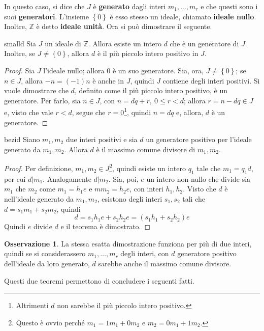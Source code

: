 \documentclass[11pt, a4paper]{scrartcl}
\theoremstyle{definition}
\numberwithin{esempio}{section}
\theoremstyle{definition}
\newtheorem{obs}{Osservazione}
\numberwithin{obs}{section}
\numberwithin{nota}{section}
\numberwithin{equation}{subsection}
\begin{document}
In questo caso, si dice che $J$ \`e \textbf{generato} dagli interi $m_1,\ldots,m_r$ e che questi sono i suoi \textbf{generatori}. L'insieme $\left\{ 0 \right\} $ \`e esso stesso un ideale, chiamato \textbf{ideale nullo}. 
Inoltre, $\mathbb{Z}$ \`e detto \textbf{ideale unit\`a}.
Ora si pu\`o dimostrare il seguente.
\begin{teorema}
	{}{smalld}
	Sia $J$ un ideale di $\mathbb{Z}$. Allora esiste un intero $d$ che \`e un generatore di $J$. Inoltre, se $J \neq \left\{ 0 \right\} $, allora $d$ \`e il pi\`u piccolo intero positivo in $J$.
	\begin{proof}
	Sia $J$ l'ideale nullo; allora $0$ \`e un suo generatore.
	Sia, ora, $J \neq \left\{ 0 \right\} $; se $n \in J$, allora $-n = (-1) n $ \`e anche in $J$, quindi $J$ contiene degli interi positivi.
	Si vuole dimostrare che $d$, definito come il pi\`u piccolo intero positivo, \`e un generatore.
	Per farlo, sia $n \in J$, con $n = dq + r, \ 0\le  r < d$; allora $r = n - dq \in J$ e, visto che vale $r < d$, segue che $r = 0$\footnote{Altrimenti $d$ non sarebbe il pi\`u piccolo intero positivo.}, quindi $n = dq$ e, allora, $d$ \`e un generatore.
	\end{proof}
\end{teorema}
\begin{teorema}
	{}{bezid}
	Siano $m_1,m_2$ due interi positivi e sia $d$ un generatore positivo per l'ideale generato da $m_1,m_2$. Allora $d$ \`e il massimo comune divisore di $m_1,m_2$.
	\begin{proof}
		Per definizione, $m_1,m_2 \in J$\footnote{Questo \`e ovvio perch\'e $m_1 = 1m_1 + 0 m_2$ e $m_2  = 0 m_1 + 1 m_2$.}, quindi esiste un intero $q_1$ tale che $m_1=q_1 d$, per cui $d|
		m_1$.
		Analogamente $d|m_2$.
		Sia, poi, $e$ un intero non-nullo che divide sia $m_1$ che $m_2$ come $m_1 = h_1 e$ e $mm_2=h_2 e$, con interi $h_1,h_2$.
		Visto che $d$ \`e nell'ideale generato da $m_1,m_2$, esistono degli interi $s_1,s_2$ tali che $d = s_1m_1 + s_2m_2$, quindi
		\[
		d = s_1h_1e + s_2h_2e = (s_1h_1 + s_2h_2) e
		\] 
		Quindi $e $ divide $d$ e il teorema \`e dimostrato.
	\end{proof}
\end{teorema}
\begin{obs}
	La stessa esatta dimostrazione funziona per pi\`u di due interi, quindi se si considerassero $m_1,\ldots,m _r$ degli interi, con $d$ generatore positivo dell'ideale da loro generato, $d$ sarebbe anche il massimo comune divisore.
\end{obs}
\noindent Questi due teoremi permettono di concludere i seguenti fatti.
\end{document}
